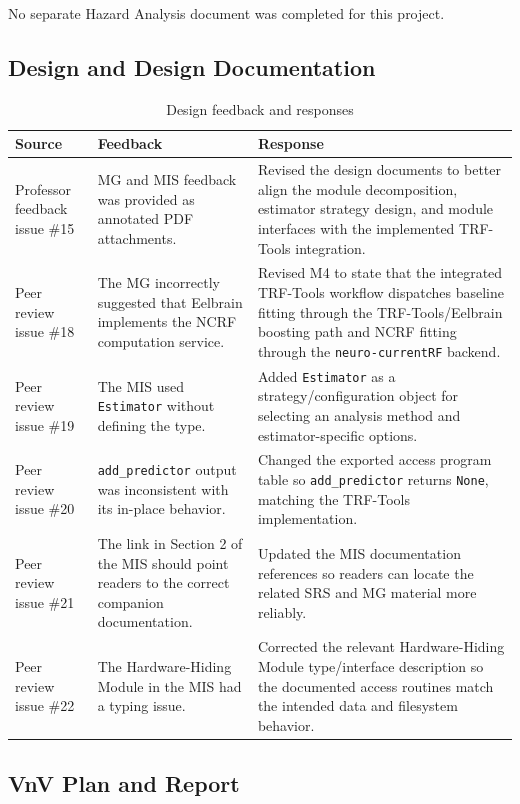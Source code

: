 \documentclass{article}
\begin{document}
No separate Hazard Analysis document was completed for this project.

\subsection{Design and Design Documentation}

\begin{table}[H]
\centering
\begin{tabularx}{\textwidth}{p{} p{} X}
\toprule
\textbf{Source} & \textbf{Feedback} & \textbf{Response}\\
\midrule
Professor feedback issue \#15 & MG and MIS feedback was provided as annotated PDF attachments. & Revised the design documents to better align the module decomposition, estimator strategy design, and module interfaces with the implemented TRF-Tools integration.\\
Peer review issue \#18 & The MG incorrectly suggested that Eelbrain implements the NCRF computation service. & Revised M4 to state that the integrated TRF-Tools workflow dispatches baseline fitting through the TRF-Tools/Eelbrain boosting path and NCRF fitting through the \texttt{neuro-currentRF} backend.\\
Peer review issue \#19 & The MIS used \texttt{Estimator} without defining the type. & Added \texttt{Estimator} as a strategy/configuration object for selecting an analysis method and estimator-specific options.\\
Peer review issue \#20 & \texttt{add\_predictor} output was inconsistent with its in-place behavior. & Changed the exported access program table so \texttt{add\_predictor} returns \texttt{None}, matching the TRF-Tools implementation.\\
Peer review issue \#21 & The link in Section 2 of the MIS should point readers to the correct companion documentation. & Updated the MIS documentation references so readers can locate the related SRS and MG material more reliably.\\
Peer review issue \#22 & The Hardware-Hiding Module in the MIS had a typing issue. & Corrected the relevant Hardware-Hiding Module type/interface description so the documented access routines match the intended data and filesystem behavior.\\
\bottomrule
\end{tabularx}
\caption{Design feedback and responses}
\end{table}

\subsection{VnV Plan and Report}
\end{document}
